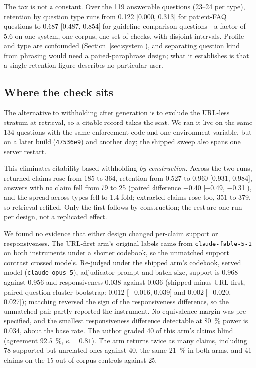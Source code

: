 \documentclass[conference,a4paper]{IEEEtran}
\begin{document}
The tax is not a constant. Over the 119 answerable questions (23--24 per type), retention by
question type runs from \num{0.122} [\num{0.000}, \num{0.313}] for patient-FAQ questions to
\num{0.687} [\num{0.487}, \num{0.854}] for guideline-comparison questions---a factor of
\num{5.6} on one system, one corpus, one set of checks, with disjoint intervals. Profile and
type are confounded (Section~\ref{sec:system}), and separating question kind from phrasing
would need a paired-paraphrase design; what it establishes is that a single retention figure
describes no particular user.

\subsection{Where the check sits}
\label{sec:where}
The alternative to withholding after generation is to exclude the URL-less stratum at
retrieval, so a citable record takes the seat. We ran it live on the same 134 questions with
the same enforcement code and one environment variable, but on a later build
(\texttt{47536e9}) and another day; the shipped sweep also spans one server restart.

This eliminates citability-based withholding \emph{by construction}. Across the two runs,
returned claims rose from 185 to \num{364}, retention from \num{0.527} to \num{0.960}
[\num{0.931}, \num{0.984}], answers with no claim fell from 79 to 25 (paired difference
\num{-0.40} [\num{-0.49}, \num{-0.31}]), and the spread across types fell to \num{1.4}-fold;
extracted claims rose too, 351 to 379, so retrieval refilled. Only the first follows by
construction; the rest are one run per design, not a replicated effect.

We found no evidence that either design changed per-claim support or responsiveness. The
URL-first arm's original labels came from \texttt{claude-fable-5-1} on both instruments under
a shorter codebook, so the unmatched support contrast crossed models. Re-judged under the
shipped arm's codebook, served model (\texttt{claude-opus-5}), adjudicator prompt and batch
size, support is \num{0.968} against \num{0.956} and responsiveness \num{0.038} against \num{0.036}
(shipped minus URL-first, paired-question cluster bootstrap: \num{0.012} [\num{-0.016},
\num{0.039}] and \num{0.002} [\num{-0.020}, \num{0.027}]); matching reversed the sign of the
responsiveness difference, so the unmatched pair partly reported the instrument. No
equivalence margin was pre-specified, and the smallest responsiveness difference detectable at
\SI{80}{\percent} power is \num{0.034}, about the base rate. The author graded \num{40} of this
arm's claims blind (agreement \SI{92.5}{\percent}, $\kappa = \num{0.81}$). The arm returns
twice as many claims, including \num{78} supported-but-unrelated ones against \num{40}, the
same \SI{21}{\percent} in both arms, and \num{41} claims on the 15 out-of-corpus controls
against \num{25}.
\end{document}
